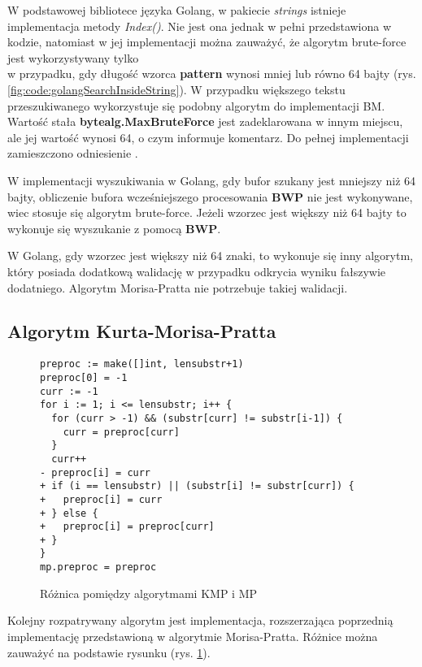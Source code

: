 W podstawowej bibliotece języka Golang, w pakiecie \textit{strings} istnieje 
implementacja metody \textit{Index()}. Nie jest ona jednak w pełni przedstawiona
w kodzie, natomiast w jej implementacji można zauważyć, że algorytm brute-force
jest wykorzystywany tylko \\ w przypadku, gdy długość wzorca \textbf{pattern} wynosi
mniej lub równo 64 bajty (rys. \ref{fig:code:golangSearchInsideString}).
W przypadku większego tekstu przeszukiwanego wykorzystuje się podobny algorytm 
do implementacji BM. Wartość stała \textbf{bytealg.MaxBruteForce} jest 
zadeklarowana w innym miejscu, ale jej wartość wynosi 64, o czym informuje komentarz.
Do pełnej implementacji zamieszczono odniesienie \cite{bib:online:IndexSearchGolang}.

W implementacji wyszukiwania w Golang, gdy bufor szukany jest mniejszy niż 64 bajty,
obliczenie bufora wcześniejszego procesowania \textbf{BWP} nie jest wykonywane, 
wiec stosuje się algorytm brute-force. Jeżeli wzorzec jest większy niż 64 
bajty to wykonuje się wyszukanie z pomocą \textbf{BWP}.

W Golang, gdy wzorzec jest większy niż
64 znaki, to wykonuje się inny algorytm, który posiada dodatkową walidację w
przypadku odkrycia wyniku fałszywie dodatniego. Algorytm Morisa-Pratta nie
 potrzebuje takiej walidacji.

\subsection{Algorytm Kurta-Morisa-Pratta}

\begin{figure}[htbp]
    \begin{verbatim}
preproc := make([]int, lensubstr+1)
preproc[0] = -1
curr := -1
for i := 1; i <= lensubstr; i++ {
  for (curr > -1) && (substr[curr] != substr[i-1]) {
    curr = preproc[curr]
  }
  curr++
- preproc[i] = curr
+ if (i == lensubstr) || (substr[i] != substr[curr]) {
+   preproc[i] = curr
+ } else {
+   preproc[i] = preproc[curr]
+ }
}
mp.preproc = preproc
    \end{verbatim}
  \caption{Różnica pomiędzy algorytmami KMP i MP}
  \label{fig:code:KurtMorisPrattVsMorisPratt}
\end{figure}

Kolejny rozpatrywany algorytm jest implementacja, rozszerzająca poprzednią 
implementację przedstawioną w algorytmie Morisa-Pratta. Różnice można zauważyć na podstawie rysunku
(rys. \ref{fig:code:KurtMorisPrattVsMorisPratt}).

